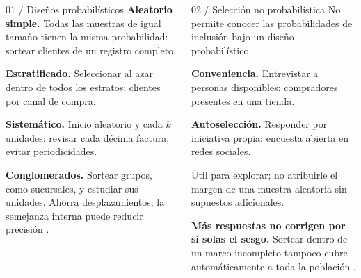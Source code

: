 \documentclass[spanish,final,xcolor={dvipsnames,table}]{beamer}
\newlength{\fusionpanelwidth}
\begin{document}
\begin{itescaposter}
\begin{columns}[T,totalwidth=\colwidth]
\begin{column}{\fusionpanelwidth}
\begin{itescaposterpanel}{01 / Diseños probabilísticos}
\textbf{Aleatorio simple.} Todas las muestras de igual tamaño tienen la misma probabilidad: sortear clientes de un registro completo.

\textbf{Estratificado.} Seleccionar al azar dentro de todos los estratos: clientes por canal de compra.

\textbf{Sistemático.} Inicio aleatorio y cada $k$ unidades: revisar cada décima factura; evitar periodicidades.

\textbf{Conglomerados.} Sortear grupos, como sucursales, y estudiar sus unidades. Ahorra desplazamientos; la semejanza interna puede reducir precisión \citep{holmesBusiness2023}.
\end{itescaposterpanel}
\end{column}
\begin{column}{\fusionpanelwidth}
\begin{itescaposterpanel}{02 / Selección no probabilística}
No permite conocer las probabilidades de inclusión bajo un diseño probabilístico.

\textbf{Conveniencia.} Entrevistar a personas disponibles: compradores presentes en una tienda.

\textbf{Autoselección.} Responder por iniciativa propia: encuesta abierta en redes sociales.

Útil para explorar; no atribuirle el margen de una muestra aleatoria sin supuestos adicionales.

{\color{itescaPosterRed}\bfseries Más respuestas no corrigen por sí solas el sesgo.} Sortear dentro de un marco incompleto tampoco cubre automáticamente a toda la población \citep{bradley2021}.
\end{itescaposterpanel}
\end{column}
\end{columns}


\end{itescaposter}
\end{document}
